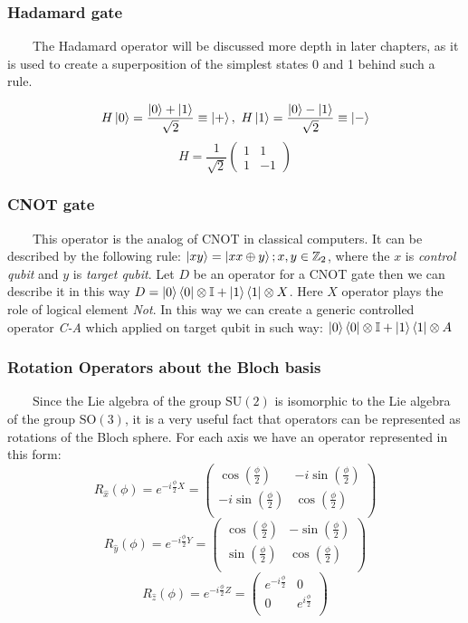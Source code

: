 \documentclass[english,14pt,a4paper]{article}
\begin{document}
\begin{spacing}{1.5}
	\subsubsection{Hadamard gate}\ \ \ \
	The Hadamard operator will be discussed more depth in later chapters, as it is used to create a superposition of the simplest states 0 and 1 behind such a rule. 
	
	\[
		H \ket{0} = \frac{\ket{0} + \ket{1}}{\sqrt{2}} \equiv \ket{+}, \ H \ket{1} = \frac{\ket{0} - \ket{1}}{\sqrt{2}} \equiv \ket{-}
	\]
	\begin{equation}
	H = \frac{1}{\sqrt{2}} \begin{pmatrix} 1 & 1 \\ 1 & -1 \end{pmatrix}
	\end{equation}
	
	\subsubsection{CNOT gate}\ \ \ \
	This operator is the analog of CNOT in classical computers. It can be described by the following rule: $\ket{xy} = \ket{x x \oplus y}; x, y \in \mathbb{Z}_2$, where the $x$ is \textit{control qubit} and $y$ is \textit{target qubit}. Let $D$ be an operator for a CNOT gate then we can describe it in this way $D = \ket{0}\bra{0} \otimes \mathbb{I} + \ket{1}\bra{1} \otimes X$. Here $X$ operator plays the role of logical element \textit{Not}. In this way we can create a generic controlled operator \textit{C-A} which applied on target qubit in such way: $\ket{0}\bra{0} \otimes \mathbb{I} + \ket{1}\bra{1} \otimes A $
	\subsubsection{Rotation Operators about the Bloch basis}\ \ \ \
	Since the Lie algebra of the group $\text{SU}(2)$ is isomorphic to the Lie algebra of the group $\text{SO}(3)$, it is a very useful fact that operators can be represented as rotations of the Bloch sphere. For each axis we have an operator represented in this form:
	\[
		R_{\hat{x}}(\phi) = e^{-i\frac{\phi}{2}X} = \begin{pmatrix}
			\cos(\frac{\phi}{2}) & -i\sin(\frac{\phi}{2}) \\
			-i\sin(\frac{\phi}{2}) & \cos(\frac{\phi}{2}) \\
		\end{pmatrix}	
	\]
	\[
	R_{\hat{y}}(\phi) = e^{-i\frac{\phi}{2}Y} = \begin{pmatrix}
		\cos(\frac{\phi}{2}) & -\sin(\frac{\phi}{2}) \\
		\sin(\frac{\phi}{2}) & \cos(\frac{\phi}{2}) \\
	\end{pmatrix}	
	\]
	\[
	R_{\hat{z}}(\phi) = e^{-i\frac{\phi}{2}Z} = \begin{pmatrix}
		e^{-i\frac{\phi}{2}} & 0 \\
		0 &  e^{i\frac{\phi}{2}}\\
	\end{pmatrix}	
	\]
	

\end{spacing}
\end{document}
